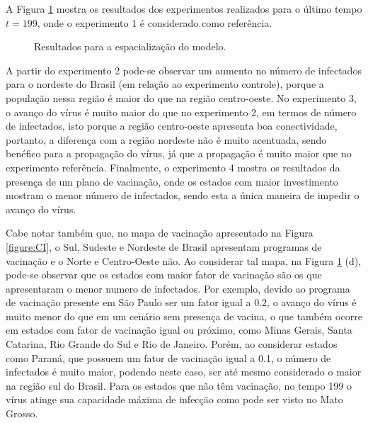 \documentclass[a4paper,12pt]{article}
\begin{document}
\newpage

A Figura \ref{fig:exp_espa} mostra os resultados dos experimentos realizados para o último tempo $t=199$, onde o experimento 1 é considerado como referência.

\begin{figure}[!ht]
\centering
{}
\qquad
{}

\qquad
{}
\caption{Resultados para a espacialização do modelo.}
\label{fig:exp_espa}
\end{figure}

A partir do experimento 2 pode-se observar um aumento no número de infectados para o nordeste do Brasil (em relação ao experimento controle), porque a população nessa região é maior do que na região centro-oeste. No experimento 3, o avanço do vírus é muito maior do que no experimento 2, em termos de número de infectados, isto porque a região centro-oeste apresenta boa conectividade, portanto, a diferença com a região nordeste não é muito acentuada, sendo benéfico para a propagação do vírus, já que a propagação é muito maior que no experimento referência. Finalmente, o experimento 4 mostra os resultados da presença de um plano de vacinação, onde os estados com maior investimento mostram o menor número de infectados, sendo esta a única maneira de impedir o avanço do vírus.

\newpage


Cabe notar também que, no mapa de vacinação apresentado na Figura \ref{figure:CI}, o Sul, Sudeste e Nordeste de Brasil apresentam programas de vacinação e o Norte e Centro-Oeste não. Ao considerar tal mapa, na Figura \ref{fig:exp_espa} (d), pode-se observar que os estados com maior fator de vacinação são os que apresentaram o menor numero de infectados. Por exemplo, devido ao programa de vacinação presente em São Paulo ser um fator igual a 0.2, o avanço do vírus é muito menor do que em um cenário sem presença de vacina, o que também ocorre em estados com fator de vacinação igual ou próximo, como Minas Gerais, Santa Catarina, Rio Grande do Sul e Rio de Janeiro. Porém, ao considerar estados como Paraná, que possuem um fator de vacinação igual a 0.1, o número de infectados é muito maior, podendo neste caso, ser até mesmo considerado o maior na região sul do Brasil. Para os estados que não têm vacinação, no tempo 199 o vírus atinge sua capacidade máxima de infecção como pode ser visto no Mato Grosso.
\end{document}
